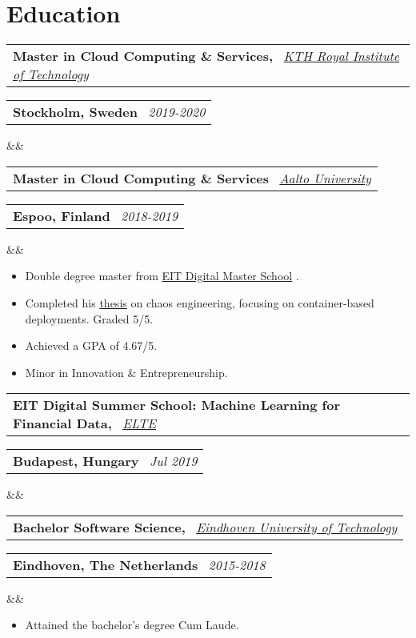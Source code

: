 \documentclass[11pt,a4paper,sans]{moderncv}
\makeatletter
\newcommand*{\customcventry}[7][.13em]{
\begin{tabular}{@{}l}
{\bfseries #4} \
{\itshape #3}
\end{tabular}
\hfill
\begin{tabular}{l@{}}
{\bfseries #5} \
{\itshape #2}
\end{tabular}
\ifx&#7&%
\else{\
\begin{minipage}{\maincolumnwidth}%
\small#7%
\end{minipage}}\fi%
\par\addvspace{#1}}
\newcommand{\inlineLink}[2]{%
    \underline{\href{#1}{#2}}%
}
\makeatother
\begin{document}
\section{Education}{
 
 \customcventry
 {2019-2020}
 {\color{blue}\href{https://kth.se/en}{KTH Royal Institute of Technology}}
 {Master in Cloud Computing \& Services,}
 {Stockholm, Sweden}
 {}{}{} %
 \customcventry{2018-2019}{\color{blue}\href{https://www.aalto.fi/en}{Aalto University}}
 {\color{white}Master in Cloud Computing \& Services}
 {Espoo, Finland}{}{}
 {
 	\begin{itemize}[leftmargin=0.6cm, label={\textbullet}]
 		\item Double degree master from \inlineLink{https://eit.europa.eu/our-activities/opportunities/eit-digital-master-school}{EIT Digital Master School}.
 		\item Completed his \inlineLink{https://urn.kb.se/resolve?urn=urn:nbn:se:kth:diva-291281}{thesis} on chaos engineering, focusing on container-based deployments. Graded 5/5.
 		\item Achieved a GPA of 4.67/5.
 		\item Minor in Innovation \& Entrepreneurship.
 	\end{itemize}
 }
 
 \customcventry
 {Jul 2019}
 {\color{blue}\href{https://www.elte.hu/en/}{ELTE}}
 {EIT Digital Summer School: Machine Learning for Financial Data,}
 {Budapest, Hungary}
 {}{}
 {
\vspace{2mm} %
 }
 
 \customcventry
 {2015-2018}
 {\color{blue}\href{https://tue.nl/}{Eindhoven University of Technology}}
 {Bachelor Software Science,}
 {Eindhoven, The Netherlands}{}{}
 {
 	\begin{itemize}[leftmargin=0.6cm, label={\textbullet}]
 		\item Attained the bachelor's degree Cum Laude. 
 	\end{itemize}
 }
 
}
\end{document}
